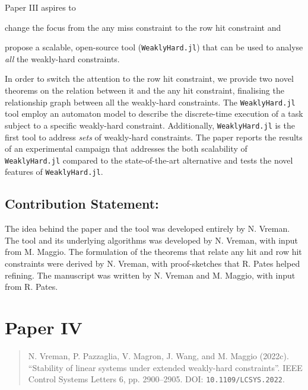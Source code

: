 \documentclass{article}
\begin{document}
Paper III aspires to
\begin{enumerate*}[label=(\roman*)]
    \item change the focus from the any miss constraint to the row hit constraint and
    \item propose a scalable, open-source tool (\texttt{WeaklyHard.jl}) that can be used to analyse \emph{all} the weakly-hard constraints.
\end{enumerate*}
In order to switch the attention to the row hit constraint, we provide two novel theorems on the relation between it and the any hit constraint, finalising the relationship graph between all the weakly-hard constraints.
The \texttt{WeaklyHard.jl} tool employ an automaton model to describe the discrete-time execution of a task subject to a specific weakly-hard constraint.
Additionally, \texttt{WeaklyHard.jl} is the first tool to address \emph{sets} of weakly-hard constraints.
The paper reports the results of an experimental campaign that addresses the both scalability of \texttt{WeaklyHard.jl} compared to the state-of-the-art alternative and tests the novel features of \texttt{WeaklyHard.jl}.

\subsection*{Contribution Statement:}%
%
The idea behind the paper and the tool was developed entirely by N. Vreman. 
The tool and its underlying algorithms was developed by N. Vreman, with input from M. Maggio.
The formulation of the theorems that relate any hit and row hit constraints were derived by N. Vreman, with proof-sketches that R. Pates helped refining.
The manuscript was written by N. Vreman and M. Maggio, with input from R. Pates.


\section*{Paper IV}%
%
\begin{quote}
N. Vreman, P. Pazzaglia, V. Magron, J. Wang, and M. Maggio (2022c). ``Stability of linear systems under extended weakly-hard constraints''. IEEE Control Systems Letters 6, pp. 2900–2905. DOI: \texttt{10.1109/LCSYS.2022}.
\end{quote}
\end{document}
